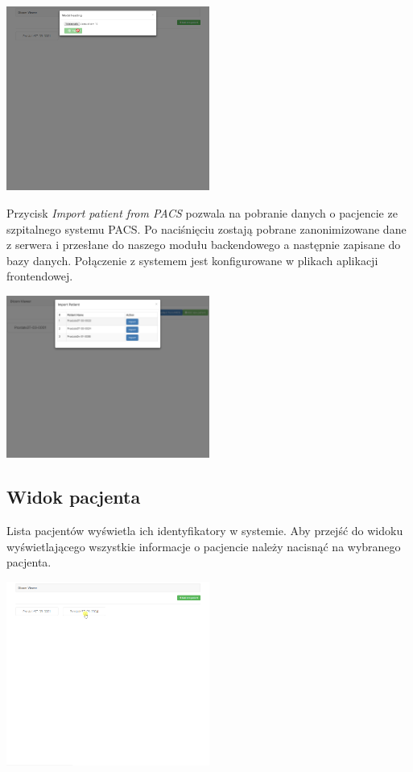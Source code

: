 \documentclass[a4paper,11pt,twoside]{report}
\theoremstyle{definition}
\begin{document}
\begin{minipage}[h]{\linewidth}
	\centering
	\includegraphics[width=0.5\textwidth]{FrontScreen/Main/114.png}
\end{minipage}

Przycisk \textit{Import patient from PACS} pozwala na pobranie danych o pacjencie ze szpitalnego systemu PACS. Po naciśnięciu zostają pobrane zanonimizowane dane z serwera i przesłane do naszego modułu backendowego a następnie zapisane do bazy danych. Połączenie z systemem jest konfigurowane w plikach aplikacji frontendowej.

\begin{minipage}[h]{\linewidth}
	\centering
	\includegraphics[width=0.5\textwidth]{FrontScreen/PACS/pacs.png}
\end{minipage}

\subsection{Widok pacjenta}

Lista pacjentów wyświetla ich identyfikatory w systemie. Aby przejść do widoku wyświetlającego wszystkie informacje o pacjencie należy nacisnąć na wybranego pacjenta.

\begin{minipage}[h]{\linewidth}
	\centering
	\includegraphics[width=0.5\textwidth]{FrontScreen/Patient/0.png}
\end{minipage}
\end{document}
